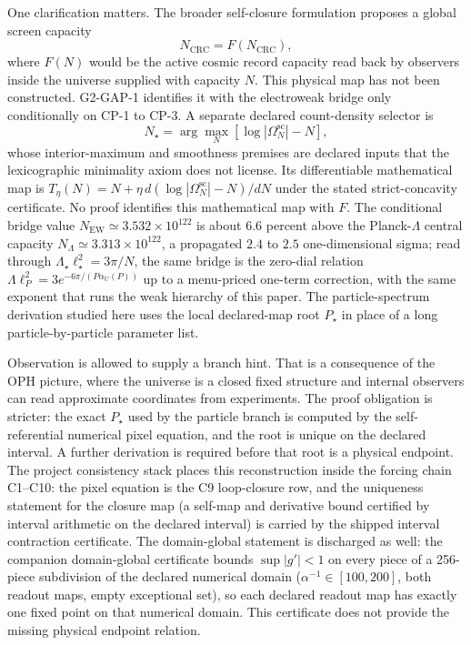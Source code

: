 \documentclass[11pt]{article}
\begin{document}
One clarification matters. The broader self-closure formulation proposes a global screen capacity
\[
N_{\mathrm{CRC}}=F(N_{\mathrm{CRC}}),
\]
where \(F(N)\) would be the active cosmic record capacity read back by observers inside the universe
supplied with capacity \(N\). This physical map has not been constructed. G2-GAP-1 identifies it
with the electroweak bridge only conditionally on CP-1 to CP-3. A separate declared count-density selector is
\[
N_\star=\arg\max_N\left[\log|\Omega^{\mathrm{sc}}_N|-N\right],
\]
whose interior-maximum and smoothness premises are declared inputs that the lexicographic
minimality axiom does not license. Its differentiable mathematical map is
\(T_\eta(N)=N+\eta\,d(\log|\Omega^{\mathrm{sc}}_N|-N)/dN\) under the stated strict-concavity
certificate. No proof identifies this mathematical map with \(F\). The conditional bridge value
\(N_{\mathrm{EW}}\simeq3.532\times10^{122}\) is about \(6.6\) percent above the
Planck-\(\Lambda\) central capacity \(N_\Lambda\simeq3.313\times10^{122}\), a
propagated \(2.4\) to \(2.5\) one-dimensional sigma; read through
\(\Lambda_\star\ell_\star^2=3\pi/N\), the same bridge is the zero-dial relation
\(\Lambda\ell_P^2=3e^{-6\pi/(P\alpha_U(P))}\) up to a menu-priced one-term
correction, with the same exponent that runs the weak hierarchy of this paper. The
particle-spectrum derivation studied here uses the local declared-map root \(P_\star\) in place of
a long particle-by-particle parameter list.

Observation is allowed to supply a branch hint. That is a consequence of the OPH picture, where
the universe is a closed fixed structure and internal observers can read approximate coordinates
from experiments. The proof obligation is stricter: the exact \(P_\star\) used by the particle
branch is computed by the self-referential numerical pixel equation, and the root is unique on the
declared interval. A further derivation is required before that root is a physical endpoint.
The project consistency stack places this reconstruction inside the forcing
chain C1--C10: the pixel equation is the C9 loop-closure row, and the uniqueness statement
for the closure map (a self-map and derivative bound certified by interval arithmetic on the
declared interval) is carried by the shipped interval contraction certificate. The
domain-global statement is discharged as well: the companion domain-global certificate bounds
\(\sup|g'|<1\) on every piece of a 256-piece subdivision of the declared numerical domain
(\(\alpha^{-1}\in[100,200]\), both readout maps, empty exceptional set), so each declared readout
map has exactly one fixed point on that numerical domain. This certificate does not provide the
missing physical endpoint relation.
\end{document}
